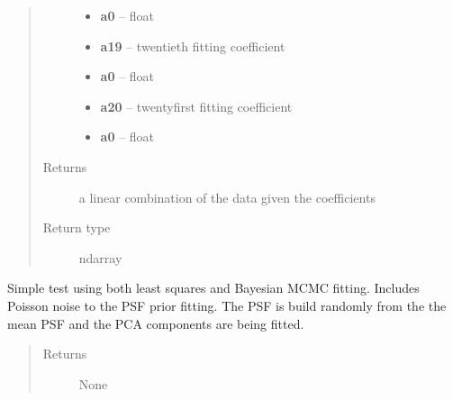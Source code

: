 \documentclass[a4paper,11pt,english]{sphinxmanual}
\begin{document}
\begin{fulllineitems}
\begin{quote}
\begin{description}
\begin{itemize}
\item {} 
\textbf{a0} -- float

\item {} 
\textbf{a19} -- twentieth fitting coefficient

\item {} 
\textbf{a0} -- float

\item {} 
\textbf{a20} -- twentyfirst fitting coefficient

\item {} 
\textbf{a0} -- float

\end{itemize}

\item[{Returns}] \leavevmode
a linear combination of the data given the coefficients

\item[{Return type}] \leavevmode
ndarray

\end{description}\end{quote}

\end{fulllineitems}


\begin{fulllineitems}
\label{analysis:analysis.fitPSF.test}
Simple test using both least squares and Bayesian MCMC fitting.
Includes Poisson noise to the PSF prior fitting. The PSF is build randomly
from the the mean PSF and the PCA components are being fitted.
\begin{quote}\begin{description}
\item[{Returns}] \leavevmode
None

\end{description}\end{quote}

\end{fulllineitems}

\end{document}
